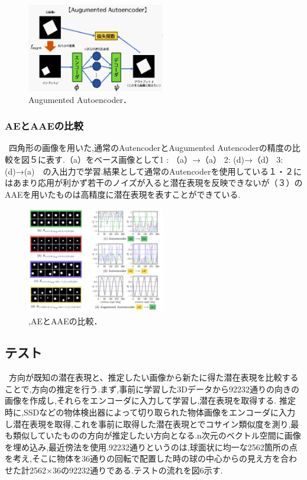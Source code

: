 \documentclass[11pt,a4j,ascmac]{jarticle}
\begin{document}
    \begin{figure}[htpp]
     \centering
      \includegraphics[width=60mm]{pic4.eps}
      \vspace*{30mm}
      \caption{Augumented Autoencoder．}
      \label{fig:2d_pose_estimation}
      \end{figure}


\subsubsection{AEとAAEの比較}
\  四角形の画像を用いた,通常のAutencoderとAugumented Autencoderの精度の比較を図５に表す.（a）をベース画像として1 : （a）→（a）   2: (d)→（d）  3: (d)→(a)　の入出力で学習.結果として通常のAutencoderを使用している１・２にはあまり応用が利かず若干のノイズが入ると潜在表現を反映できないが（３）のAAEを用いたものは高精度に潜在表現を表すことができている.

    \begin{figure}[htpp]
     \centering
      \includegraphics[width=60mm]{pic5.eps}
      \vspace*{30mm}
      \caption{,AEとAAEの比較．}
      \label{fig:2d_pose_estimation}
      \end{figure}


  


\subsection{テスト}
\  方向が既知の潜在表現と、推定したい画像から新たに得た潜在表現を比較することで,方向の推定を行う.まず,事前に学習した3Dデータから92232通りの向きの画像を作成し,それらをエンコーダに入力して学習し,潜在表現を取得する.
推定時に,SSDなどの物体検出器によって切り取られた物体画像をエンコーダに入力し潜在表現を取得,これを事前に取得した潜在表現とでコサイン類似度を測り,最も類似していたものの方向が推定したい方向となる.n次元のベクトル空間に画像を埋め込み,最近傍法を使用.92232通りというのは,球面状に均一な2562箇所の点を考え,そこに物体を36通りの回転で配置した時の球の中心からの見え方を合わせた計2562×36の92232通りである.テストの流れを図6示す.\\ 
\end{document}
